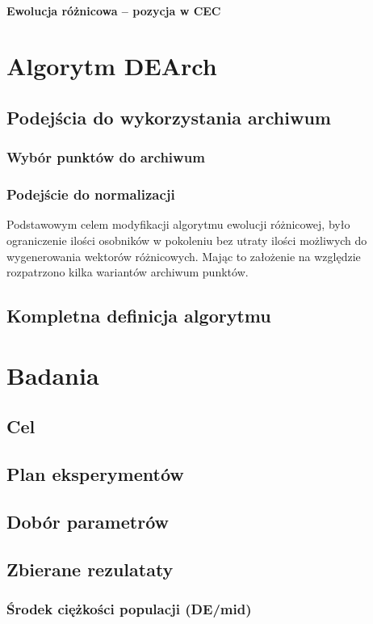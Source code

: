 \documentclass[12pt,a4paper]{report}
\begin{document}
{{{\subsubsection{Ewolucja różnicowa -- pozycja w CEC}

\chapter{Algorytm DEArch}
\par{

}
\section{Podejścia do wykorzystania archiwum}
\subsection{Wybór punktów do archiwum}
\subsection{Podejście do normalizacji}

Podstawowym celem modyfikacji algorytmu ewolucji różnicowej, było ograniczenie ilości osobników w pokoleniu bez utraty ilości możliwych do wygenerowania wektorów różnicowych. Mając to założenie na względzie rozpatrzono kilka wariantów archiwum punktów.
\section{Kompletna definicja algorytmu}

\chapter{Badania}
\section{Cel}
\section{Plan eksperymentów}
\section{Dobór parametrów}
\section{Zbierane rezulataty}
\subsection{Środek ciężkości populacji (DE/mid)}
}}}
\end{document}
